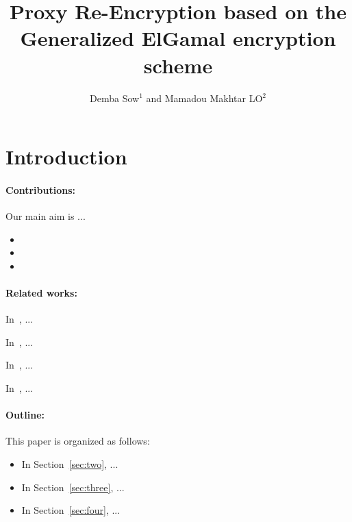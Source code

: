 \documentclass[a4paper,11pt]{article}
\begin{document}
\title{Proxy Re-Encryption based on the Generalized ElGamal encryption scheme}
\author{\scriptsize{Demba Sow$^{1}$ and Mamadou Makhtar LO$^{2}$}}

\maketitle


\tableofcontents

    \begin{abstract}

    \end{abstract}

\section{Introduction}

\paragraph{Contributions:} Our main aim is ...

\begin{itemize}
 \item
 \item
 \item
\end{itemize}

\paragraph{Related works:}

In~\cite{improveproxy}, ...


In~\cite{Elgamal}, ...


In~\cite{sow}, ...


In~\cite{cramer2003design}, ...


\paragraph{Outline:} This paper is organized as follows:
\begin{itemize}
 \item In Section~\ref{sec:two}, ... 
 \item In Section~\ref{sec:three}, ... 
 \item In Section~\ref{sec:four}, ... 
\end{itemize}
\end{document}
